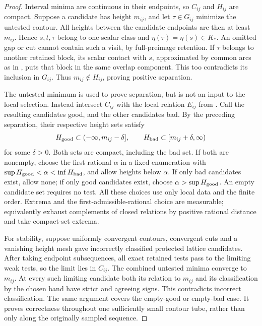 \begin{proof}
Interval minima are continuous in their endpoints, so \(C_{ij}\) and \(H_{ij}\) are compact. Suppose a candidate has height \(m_{ij}\), and let \(\tau\in G_{ij}\) minimize the untested contour. All heights between the candidate endpoints are then at least \(m_{ij}\). Hence \(s,t,\tau\) belong to one scalar class and \(\eta(\tau)=\eta(s)\in K_*\). An omitted gap or cut cannot contain such a visit, by full-preimage retention. If \(\tau\) belongs to another retained block, its scalar contact with \(s\), approximated by common arcs as in , puts that block in the same overlap component. This too contradicts its inclusion in \(G_{ij}\). Thus \(m_{ij}\notin H_{ij}\), proving positive separation.

The untested minimum is used to prove separation, but is not an input to the local selection. Instead intersect \(C_{ij}\) with the local relation \(E_{ij}\) from . Call the resulting candidates good, and the other candidates bad. By the preceding separation, their respective height sets satisfy
\[
 H_{\rm good}\subset(-\infty,m_{ij}-\delta],\qquad
 H_{\rm bad}\subset[m_{ij}+\delta,\infty)
\]
for some \(\delta>0\). Both sets are compact, including the bad set. If both are nonempty, choose the first rational \(\alpha\) in a fixed enumeration with
\(\sup H_{\rm good}<\alpha<\inf H_{\rm bad}\), and allow heights below \(\alpha\). If only bad candidates exist, allow none; if only good candidates exist, choose \(\alpha>\sup H_{\rm good}\). An empty candidate set requires no test. All these choices use only local data and the finite order. Extrema and the first-admissible-rational choice are measurable; equivalently exhaust complements of closed relations by positive rational distance and take compact-set extrema.

For stability, suppose uniformly convergent contours, convergent cuts and a vanishing height mesh gave incorrectly classified protected lattice candidates. After taking endpoint subsequences, all exact retained tests pass to the limiting weak tests, so the limit lies in \(C_{ij}\). The combined untested minima converge to \(m_{ij}\). At every such limiting candidate both its relation to \(m_{ij}\) and its classification by the chosen band have strict and agreeing signs. This contradicts incorrect classification. The same argument covers the empty-good or empty-bad case. It proves correctness throughout one sufficiently small contour tube, rather than only along the originally sampled sequence.
\end{proof}

